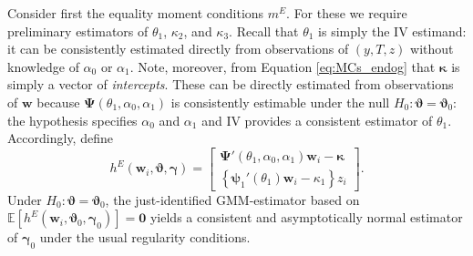 Consider first the equality moment conditions $m^E$.
For these we require preliminary estimators of $\theta_1$, $\kappa_2$, and $\kappa_3$.
Recall that $\theta_1$ is simply the IV estimand: it can be consistently estimated directly from observations of $(y,T,z)$ without knowledge of $\alpha_0$ or $\alpha_1$.
Note, moreover, from Equation \ref{eq:MCs_endog} that $\boldsymbol{\kappa}$ is simply a vector of \emph{intercepts}.
These can be directly estimated from observations of $\mathbf{w}$ because $\boldsymbol{\Psi}(\theta_1, \alpha_0, \alpha_1)$ is consistently estimable under the null $H_0\colon \boldsymbol{\vartheta} = \boldsymbol{\vartheta}_0$: the hypothesis specifies $\alpha_0$ and $\alpha_1$ and IV provides a consistent estimator of $\theta_1$.
Accordingly, define 
\begin{equation}
  h^E(\mathbf{w}_i, \boldsymbol{\vartheta}, \boldsymbol{\gamma})  =  \left[
 \begin{array}{l}
   \boldsymbol{\Psi}'(\theta_1, \alpha_0, \alpha_1) \mathbf{w}_i - \boldsymbol{\kappa}\\
   \left\{\boldsymbol{\psi}_1'(\theta_1)\mathbf{w}_i - \kappa_1\right\}z_i
 \end{array}
 \right].
 \label{eq:hE}
\end{equation}
Under $H_0\colon \boldsymbol{\vartheta} = \boldsymbol{\vartheta}_0$, the  just-identified GMM-estimator based on $\mathbb{E}[h^E(\mathbf{w}_i, \boldsymbol{\vartheta}_0, \boldsymbol{\gamma}_0)] = \mathbf{0}$ yields a consistent and asymptotically normal estimator of $\boldsymbol{\gamma}_0$ under the usual regularity conditions.

